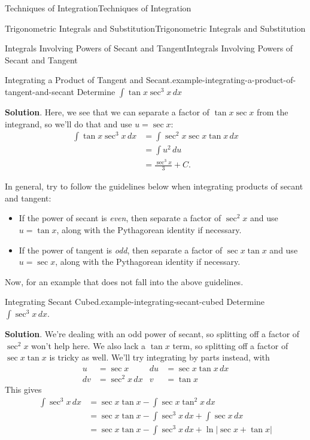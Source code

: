 \documentclass[10pt,]{book}
\numberwithin{equation}{section}
\begin{document}
\begin{chapterptx}{Techniques of Integration}{}{Techniques of Integration}{}{}
\begin{sectionptx}{Trigonometric Integrals and Substitution}{}{Trigonometric Integrals and Substitution}{}{}
\begin{subsectionptx}{Integrals Involving Powers of Secant and Tangent}{}{Integrals Involving Powers of Secant and Tangent}{}{}
\begin{example}{Integrating a Product of Tangent and Secant.}{example-integrating-a-product-of-tangent-and-secant}
\hypertarget{p-535}{}%
Determine \(\int\tan x\sec^{3} x\,dx\)%
\par\smallskip%
\noindent\textbf{Solution}.\hypertarget{solution-118}{}\quad%
\hypertarget{p-536}{}%
Here, we see that we can separate a factor of \(\tan x\sec x\) from the integrand, so we'll do that and use \(u = \sec x\):%
%
\begin{align*}
\int\tan x\sec^{3}x\,dx & = \int \sec^{2}x \sec x\tan x\,dx \\
& = \int u^{2}\,du \\
& = \frac{\sec^{3}x}{3} + C. 
\end{align*}
\end{example}
\hypertarget{p-537}{}%
In general, try to follow the guidelines below when integrating products of secant and tangent: \leavevmode%
\begin{itemize}[label=\textbullet]
\item{}If the power of secant is \emph{even}, then separate a factor of \(\sec^{2}x\) and use \(u = \tan x\), along with the Pythagorean identity if necessary.%
\item{}If the power of tangent is \emph{odd}, then separate a factor of \(\sec x\tan x\) and use \(u = \sec x\), along with the Pythagorean identity if necessary.%
\end{itemize}
%
\par
\hypertarget{p-538}{}%
Now, for an example that does not fall into the above guidelines.%
\begin{example}{Integrating Secant Cubed.}{example-integrating-secant-cubed}%
\hypertarget{p-539}{}%
Determine \(\int\sec^{3}x\,dx\).%
\par\smallskip%
\noindent\textbf{Solution}.\hypertarget{solution-119}{}\quad%
\hypertarget{p-540}{}%
We're dealing with an odd power of secant, so splitting off a factor of \(\sec^{2}x\) won't help here. We also lack a \(\tan x\) term, so splitting off a factor of \(\sec x\tan x\) is tricky as well. We'll try integrating by parts instead, with%
\begin{align*}
u & = \sec x & du & = \sec x\tan x\,dx\\
dv & = \sec^{2}x\,dx & v & = \tan x 
\end{align*}
This gives%
%
\begin{align*}
\int\sec^{3}x\,dx & = \sec x\tan x - \int \sec x\tan^{2}x\,dx \\
& = \sec x\tan x - \int\sec^{3}x\,dx + \int\sec x\,dx \\
& = \sec x\tan x - \int\sec^{3}x\,dx + \ln|\sec x + \tan x| 

\end{align*}
\end{example}
\end{subsectionptx}
\end{sectionptx}
\end{chapterptx}
\end{document}
